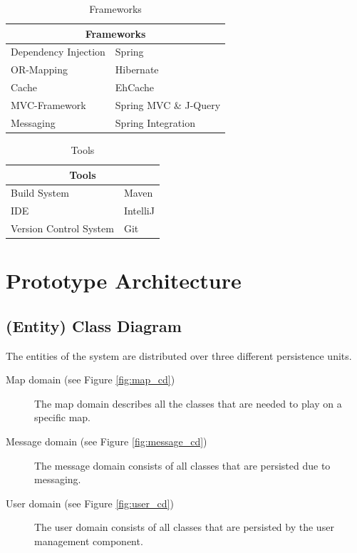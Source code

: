\documentclass[11pt]{article}
\begin{document}
\begin{table}[h]
	\begin{tabularx}{\textwidth}{| X | X |}
	\hline
	\multicolumn{2}{|c|}{\textbf{Frameworks}} \\
	\hline
	\cellcolor[gray]{0.9}
	Dependency Injection & Spring\\
	\hline
	\cellcolor[gray]{0.9}
	OR-Mapping & Hibernate\\
	\hline
	\cellcolor[gray]{0.9}
	Cache & EhCache\\
	\hline
	\cellcolor[gray]{0.9}
	MVC-Framework & Spring MVC \& J-Query\\
	\hline
	\cellcolor[gray]{0.9}
	Messaging & Spring Integration\\
	\hline
	\end{tabularx}
	\caption{Frameworks}
	\label{frameworks}
\end{table}


\begin{table}[h]
	\begin{tabularx}{\textwidth}{| X | X |}
	\hline
	\multicolumn{2}{|c|}{\textbf{Tools}} \\
	\hline
	\cellcolor[gray]{0.9}
	Build System & Maven\\
	\hline
	\cellcolor[gray]{0.9}
	IDE & IntelliJ\\
	\hline
	\cellcolor[gray]{0.9}
	Version Control System & Git\\
	\hline
	\end{tabularx}
	\caption{Tools}
	\label{tools}
\end{table}

\section{Prototype Architecture}

\subsection{(Entity) Class Diagram}

The entities of the system are distributed over three different persistence units. 

\begin{description}
\item[Map domain (see Figure \ref{fig:map_cd})]
	The map domain describes all the classes that are needed to play on a specific map. 
\item[Message domain (see Figure \ref{fig:message_cd})]
	The message domain consists of all classes that are persisted due to messaging.
\item[User domain (see Figure \ref{fig:user_cd})]
	The user domain consists of all classes that are persisted by the user management component.
\end{description}
\end{document}
